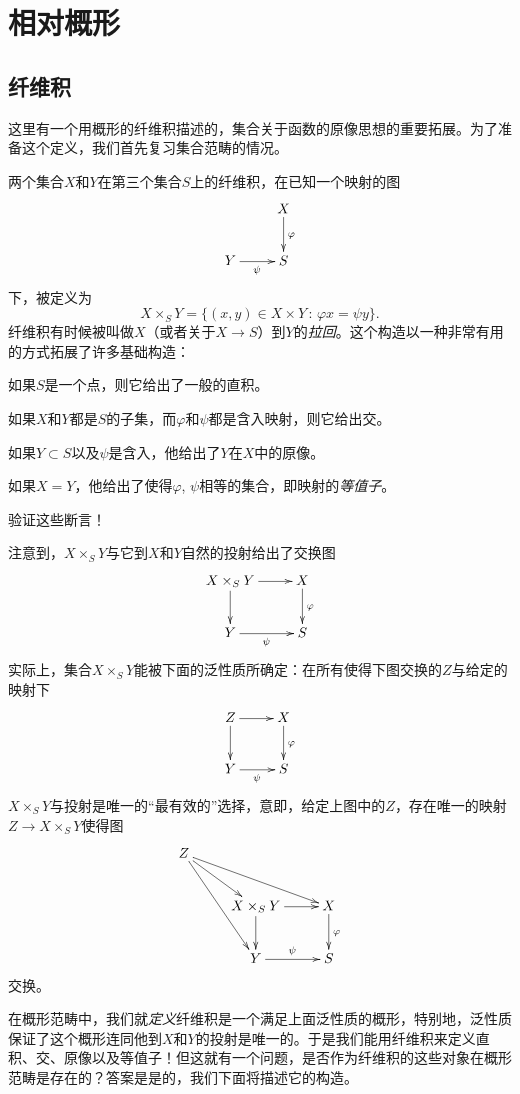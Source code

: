\section{相对概形}
\subsection{纤维积} \label{s.1.3.1}

这里有一个用概形的纤维积描述的，集合关于函数的原像思想的重要拓展。为了准备这个定义，我们首先复习集合范畴的情况。

两个集合$X$和$Y$在第三个集合$S$上的纤维积，在已知一个映射的图
\[
	\xymatrix{
	&X\ar[d]^\varphi\\
	Y\ar[r]_\psi &S
	}
\]
下，被定义为
\[
	X\times_S Y=\{(x,y)\in X\times Y\,:\,\varphi x=\psi y\}.
\]
纤维积有时候被叫做$X$（或者关于$X\to S$）到$Y$的\textit{拉回}。这个构造以一种非常有用的方式拓展了许多基础构造：

如果$S$是一个点，则它给出了一般的直积。

如果$X$和$Y$都是$S$的子集，而$\varphi$和$\psi$都是含入映射，则它给出交。

如果$Y\subset S$以及$\psi$是含入，他给出了$Y$在$X$中的原像。

如果$X=Y$，他给出了使得$\varphi$, $\psi$相等的集合，即映射的\textit{等值子}。

\begin{exe}
	验证这些断言！
\end{exe}

注意到，$X\times_S Y$与它到$X$和$Y$自然的投射给出了交换图
\[
	\xymatrix{
	X\times_S Y\ar[r]\ar[d]&X\ar[d]^\varphi\\
	Y\ar[r]_\psi &S
	}
\]
实际上，集合$X\times_S Y$能被下面的泛性质所确定：在所有使得下图交换的$Z$与给定的映射下
\[
	\xymatrix{
	Z\ar[r]\ar[d]&X\ar[d]^\varphi\\
	Y\ar[r]_\psi &S
	}
\]
$X\times_S Y$与投射是唯一的“最有效的”选择，意即，给定上图中的$Z$，存在唯一的映射$Z\to X\times_S Y$使得图
\[
	\xymatrix{
	Z\ar[dr]\ar[ddr]\ar[drr] & &\\
	& X\times_S Y \ar[r]\ar[d] &  X \ar[d]^\varphi\\
	& Y\ar[r]^\psi &  S
	}
\]
交换。

在概形范畴中，我们就\textit{定义}纤维积是一个满足上面泛性质的概形，特别地，泛性质保证了这个概形连同他到$X$和$Y$的投射是唯一的。于是我们能用纤维积来定义直积、交、原像以及等值子！但这就有一个问题，是否作为纤维积的这些对象在概形范畴是存在的？答案是是的，我们下面将描述它的构造。

